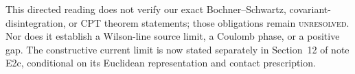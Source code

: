 \documentclass[11pt]{article}
\theoremstyle{remark}
\begin{document}
This directed reading does not verify our exact Bochner--Schwartz,
covariant-disintegration, or CPT theorem statements; those obligations
remain \textsc{unresolved}. Nor does it establish a Wilson-line source limit,
a Coulomb phase, or a positive gap. The constructive current limit is now
stated separately in Section~12 of note E2c, conditional on its Euclidean
representation and contact prescription.
\end{document}
